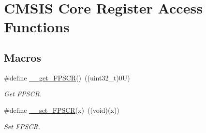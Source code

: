 \hypertarget{group___c_m_s_i_s___core___reg_acc_functions}{}\section{C\+M\+S\+IS Core Register Access Functions}
\label{group___c_m_s_i_s___core___reg_acc_functions}
\subsection*{Macros}
\begin{DoxyCompactItemize}
\item 
\#define \hyperlink{group___c_m_s_i_s___core___reg_acc_functions_ga4d0739b1355ca5642a7ce76df1271f01}{\+\_\+\+\_\+get\+\_\+\+F\+P\+S\+CR}()~((uint32\+\_\+t)0\+U)
\begin{DoxyCompactList}\small\item\em Get F\+P\+S\+CR. \end{DoxyCompactList}\item 
\#define \hyperlink{group___c_m_s_i_s___core___reg_acc_functions_ga3cd91c42ad2793c3f3ae553a1b975512}{\+\_\+\+\_\+set\+\_\+\+F\+P\+S\+CR}(x)~((void)(x))
\begin{DoxyCompactList}\small\item\em Set F\+P\+S\+CR. \end{DoxyCompactList}\end{DoxyCompactItemize}
